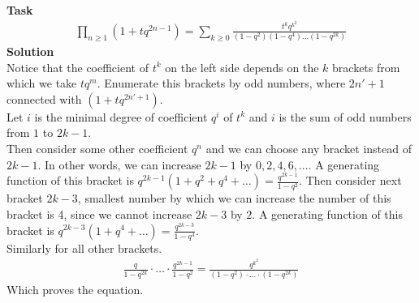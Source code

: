 \textbf{Task}
\begin{gather*}
	\prod_{n \geq 1}\left(1+t q^{2 n-1}\right)
	=
	\sum_{k \geq 0} \frac{t^{k} q^{k^{2}}}{\left(1-q^{2}\right)\left(1-q^{4}\right) \ldots\left(1-q^{2 k}\right)}
\end{gather*}
\textbf{Solution}\\
Notice that the coefficient of $t^k$ on the left side depends on the $k$ brackets from which we take $tq^m$. Enumerate this brackets by odd numbers, where $2n'+1$ connected with $(1+tq^{2n'+1})$.\\
Let $i$ is the minimal degree of coefficient $q^i$ of $t^k$ and $i$ is the sum of odd numbers from $1$ to $2k-1$.\\
Then consider some other coefficient $q^n$ and we can choose any bracket instead of $2k-1$. In other words, we can increase $2k-1$ by $0, 2, 4, 6, \ldots$. A generating function of this bracket is $q^{2k-1}(1+q^2+q^4+\ldots) = \frac{q^{2k-1}}{1 -q^2}$.
\vskip 0.1in
\noindent
Then consider next bracket $2k-3$, smallest number by which we can increase the number of this bracket is 4, since we cannot increase $2k-3$ by $2$. A generating function of this bracket is $q^{2k-3}(1+q^4+\ldots) = \frac{q^{2k-3}}{1-q^4}$.\\
Similarly for all other brackets.
\begin{gather*}
	\frac{q}{1-q^{2k}} \cdot \ldots \cdot \frac{q^{2k-1}}{1-q^2} = \frac{q^{k^2}}{(1-q^2) \cdot \ldots \cdot (1-q^{2k})}
\end{gather*}
Which proves the equation.







